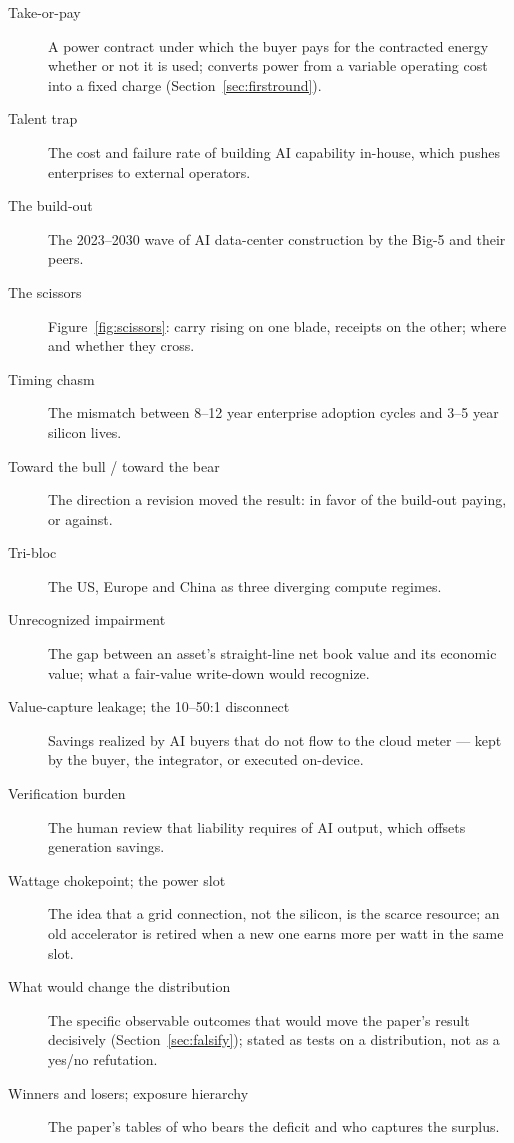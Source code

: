 \documentclass[11pt,letterpaper]{article}
\begin{document}
\begin{description}
\item[Take-or-pay] A power contract under which the buyer pays for the contracted energy whether or not it is used; converts power from a variable operating cost into a fixed charge (Section~\ref{sec:firstround}).
\item[Talent trap] The cost and failure rate of building AI capability in-house, which pushes enterprises to external operators.
\item[The build-out] The 2023--2030 wave of AI data-center construction by the Big-5 and their peers.
\item[The scissors] Figure~\ref{fig:scissors}: carry rising on one blade, receipts on the other; where and whether they cross.
\item[Timing chasm] The mismatch between 8--12 year enterprise adoption cycles and 3--5 year silicon lives.
\item[Toward the bull / toward the bear] The direction a revision moved the result: in favor of the build-out paying, or against.
\item[Tri-bloc] The US, Europe and China as three diverging compute regimes.
\item[Unrecognized impairment] The gap between an asset's straight-line net book value and its economic value; what a fair-value write-down would recognize.
\item[Value-capture leakage; the 10--50:1 disconnect] Savings realized by AI buyers that do not flow to the cloud meter --- kept by the buyer, the integrator, or executed on-device.
\item[Verification burden] The human review that liability requires of AI output, which offsets generation savings.
\item[Wattage chokepoint; the power slot] The idea that a grid connection, not the silicon, is the scarce resource; an old accelerator is retired when a new one earns more per watt in the same slot.
\item[What would change the distribution] The specific observable outcomes that would move the paper's result decisively (Section~\ref{sec:falsify}); stated as tests on a distribution, not as a yes/no refutation.
\item[Winners and losers; exposure hierarchy] The paper's tables of who bears the deficit and who captures the surplus.
\end{description}
\end{document}
